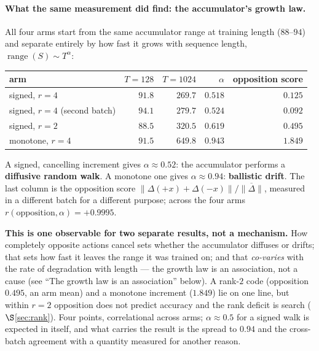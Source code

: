 \documentclass[11pt]{article}
\begin{document}
\paragraph{What the same measurement did find: the accumulator's growth law.} All
four arms start from the same accumulator range at training length ($88$--$94$) and
separate entirely by how fast it grows with sequence length,
$\operatorname{range}(S) \sim T^{\alpha}$:

\begin{center}\small
\begin{tabular}{lrrrr}
\toprule
arm & $T{=}128$ & $T{=}1024$ & $\alpha$ & opposition score \\
\midrule
signed, $r{=}4$   & $91.8$ & $269.7$ & $\mathbf{0.518}$ & $0.125$ \\
signed, $r{=}4$ (second batch) & $94.1$ & $279.7$ & $\mathbf{0.524}$ & $0.092$ \\
signed, $r{=}2$   & $88.5$ & $320.5$ & $0.619$ & $0.495$ \\
monotone, $r{=}4$ & $91.5$ & $649.8$ & $\mathbf{0.943}$ & $1.849$ \\
\bottomrule
\end{tabular}
\end{center}

\noindent A signed, cancelling increment gives $\alpha \approx 0.52$: the
accumulator performs a \textbf{diffusive random walk}. A monotone one gives
$\alpha \approx 0.94$: \textbf{ballistic drift}. The last column is the opposition
score $\lVert\Delta(+x)+\Delta(-x)\rVert/\overline{\lVert\Delta\rVert}$, measured in a
different batch for a different purpose; across the four arms
$r(\text{opposition},\alpha) = +0.9995$.

\textbf{This is one observable for two separate results, not a mechanism.} How
completely opposite actions cancel sets whether the accumulator diffuses or drifts;
that sets how fast it leaves the range it was trained on; and that \emph{co-varies}
with the rate of degradation with length --- the growth law is an association, not a
cause (see ``The growth law is an association'' below). A rank-$2$ code (opposition
$0.495$, an arm mean) and a monotone increment ($1.849$) lie on one line, but within
$r=2$ opposition does not predict accuracy and the rank deficit is search
($\S$\ref{sec:rank}). Four points, correlational
across arms; $\alpha\approx0.5$ for a signed walk is expected in itself, and what
carries the result is the spread to $0.94$ and the cross-batch agreement with a
quantity measured for another reason.
\end{document}
